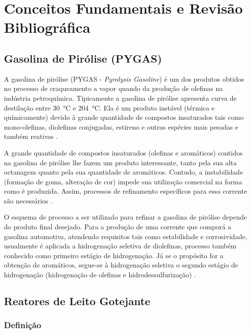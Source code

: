 %
\chapter{Conceitos Fundamentais e Revisão Bibliográfica}
\label{chap:revisaobibliografica}

\section{Gasolina de Pirólise (PYGAS)} \label{sec:pygas}
A gasolina de pirólise (PYGAS - \emph{Pyrolysis Gasoline}) é um dos produtos
obtidos no processo de craqueamento a vapor quando da produção de olefinas na
indústria petroquímica. Tipicamente a gasolina de pirólise apresenta curva de
destilação entre \SI{30}{\celsius} e \SI{204}{\celsius}. Ela é um produto
instável (térmica e químicamente) devido à grande quantidade de compostos insaturados tais como
mono-olefinas, diolefinas conjugadas, estireno e outras espécies mais pesadas e
também reativas \cite{Cheng1986}.
 
A grande quantidade de compostos insaturados (olefinas e aromáticos) contidos
na gasolina de pirólise lhe fazem um produto interessante, tanto pela
sua alta octanagem quanto pela sua quantidade de aromáticos. Contudo, a
instabilidade (formação de goma, alteração de cor) impede sua utilização
comercial na forma como é produzida. Assim, processos de refinamento específicos
para essa corrente são necessários \cite{Derrien1986}.

O esquema de processo a ser utilizado para refinar a gasolina de pirólise
depende do produto final desejado. Para a produção de uma corrente que
comporá a gasolina automotiva, atendendo requisitos tais como estabilidade e
corrosividade, usualmente é aplicada a hidrogenação seletiva de diolefinas,
processo também conhecido como primeiro estágio de hidrogenação. Já se o
propósito for a obtenção de aromáticos, segue-se à hidrogenação seletiva o
segundo estágio de hidrogenação (hidrogenação de olefinas e hidrodessulfurização)
\cite{Derrien1986}.

\section{Reatores de Leito Gotejante} \label{sec:reatorestbr}

\subsection{Definição} \label{sec:definicao}

